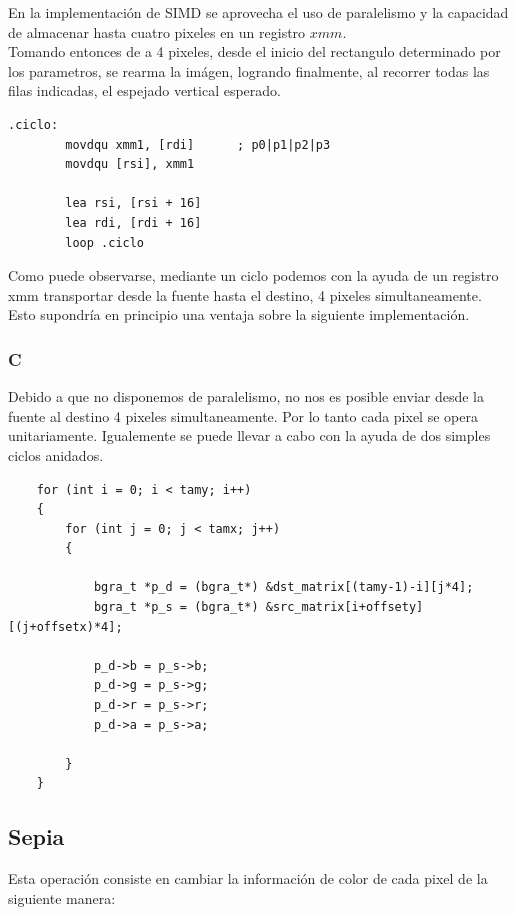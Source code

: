 En la implementación de SIMD se aprovecha el uso de paralelismo y la capacidad de almacenar hasta cuatro pixeles en un registro $xmm$.\\ 
Tomando entonces de a 4 pixeles, desde el inicio del rectangulo determinado por los parametros, se rearma la imágen, logrando finalmente, al recorrer todas las filas indicadas, el espejado vertical esperado.

\begin{codesnippet}
\begin{verbatim}
.ciclo:
        movdqu xmm1, [rdi]      ; p0|p1|p2|p3
        movdqu [rsi], xmm1
    
        lea rsi, [rsi + 16]
        lea rdi, [rdi + 16]
        loop .ciclo
\end{verbatim}
\end{codesnippet}

Como puede observarse, mediante un ciclo podemos con la ayuda de un registro xmm transportar desde la fuente hasta el destino, 4 pixeles simultaneamente. Esto supondría en principio una ventaja sobre la siguiente implementación.

\subsubsection{C}

Debido a que no disponemos de paralelismo, no nos es posible enviar desde la fuente al destino 4 pixeles simultaneamente. Por lo tanto cada pixel se opera unitariamente. Igualemente se puede llevar a cabo con la ayuda de dos simples ciclos anidados.

\begin{codesnippet}
\begin{verbatim}
    for (int i = 0; i < tamy; i++) 
    {
        for (int j = 0; j < tamx; j++) 
        {

            bgra_t *p_d = (bgra_t*) &dst_matrix[(tamy-1)-i][j*4];
            bgra_t *p_s = (bgra_t*) &src_matrix[i+offsety][(j+offsetx)*4];

            p_d->b = p_s->b;
            p_d->g = p_s->g;
            p_d->r = p_s->r;
            p_d->a = p_s->a;

        }
    }
\end{verbatim}
\end{codesnippet}

\subsection{Sepia}
Esta operación consiste en cambiar la información de color de cada pixel de la siguiente manera:

